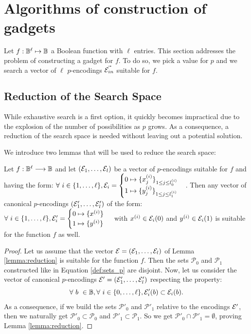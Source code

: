 \section{Algorithms of construction of gadgets}
\label{sec:search}

Let $f: \mathbb{B}^\ell \mapsto \mathbb{B}$ a Boolean function with $\ell$ entries. This section addresses the problem of constructing a gadget for $f$. To do so, we pick a value for $p$ and we search a vector of $\ell$ $p$-encodings $\Vec{\mathcal{E}_{in}}$ suitable for $f$. 

\subsection{Reduction of the Search Space}
\label{sec:restriction}

While exhaustive search is a first option, it quickly becomes impractical due to the explosion of the number of possibilities as $p$ grows. As a consequence, a reduction of the search space is needed without leaving out a potential solution.

We introduce two lemmas that will be used to reduce the search space:

\begin{lemma} 
    Let $f: \mathbb{B}^\ell \longrightarrow \mathbb{B}$ and let $(\mathcal{E}_1, \dots, \mathcal{E}_l)$ be a vector of $p$-encodings suitable for $f$ and having the form:
    $\forall~i \in \{1, \dots, \ell\}, \mathcal{E}_i = \begin{cases} 0 \mapsto \{x_j^{(i)}\}_{1 \le j \le l_0^{(i)}} \\ 1 \mapsto \{y_j^{(i)}\}_{1 \le j \le l_1^{(i)}} \end{cases}$.
    Then any vector of canonical $p$-encodings $(\mathcal{E}'_1, \dots, \mathcal{E}'_l)$ of the form: $ \forall~i \in \{1, \dots, \ell\}, \mathcal{E}'_i = \begin{cases} 0 \mapsto \{x^{(i)}\} \\ 1 \mapsto \{y^{(i)}\} \end{cases}$ with $x^{(i)} \in \mathcal{E}_i(0)$ and $ y^{(i)} \in \mathcal{E}_i(1)$ is suitable for the function $f$ as well.
    \label{lemma:reduction}
\end{lemma}


\begin{proof}
Let us assume that the vector $\mathcal{E} = (\mathcal{E}_1, \dots, \mathcal{E}_l)$ of Lemma \ref{lemma:reduction} is suitable for the function $f$. Then the sets $\mathcal{P}_0$ and $\mathcal{P}_1$ constructed like in Equation \ref{def:sets_p} are disjoint.
Now, let us consider the vector of canonical $p$-encodings $\mathcal{E}' = (\mathcal{E}'_1, \dots, \mathcal{E}'_l)$ respecting the property:
$$
\forall~b \ \in \mathbb{B}, \forall 
~i \in \{0, \dots, \ell\}, \mathcal{E}'_i(b) \subset \mathcal{E}_i(b).
$$
As a consequence, if we build the sets $\mathcal{P'}_0$ and $\mathcal{P'}_1$ relative to the encodings $\mathcal{E}'$, then we naturally get $\mathcal{P'}_0 \subset \mathcal{P}_0$ and $\mathcal{P'}_1 \subset \mathcal{P}_1$. So we get $\mathcal{P'}_0 \cap \mathcal{P'}_1 = \emptyset$, proving Lemma \ref{lemma:reduction}.
\end{proof}


